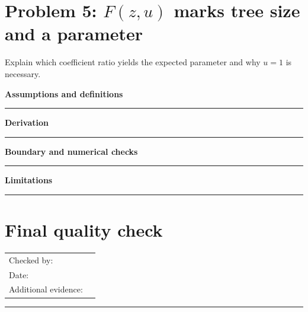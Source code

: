 \documentclass[11pt]{article}
\begin{document}
\section{\texorpdfstring{Problem 5: $F(z,u)$ marks tree size and a parameter}{Problem 5: Bivariate generating function F(z,u) marking tree size and a parameter}}
Explain which coefficient ratio yields the expected parameter and why $u=1$ is necessary.\par\medskip
\textbf{Assumptions and definitions}\par\vspace{0.7cm}\hrule\vspace{0.35cm}
\textbf{Derivation}\par\vspace{2.1cm}\hrule\vspace{0.3cm}
\textbf{Boundary and numerical checks}\par\vspace{1.1cm}\hrule\vspace{0.35cm}
\textbf{Limitations}\par\vspace{0.9cm}\hrule\vspace{0.35cm}
\clearpage
\section{Final quality check}
\begin{tabularx}{\linewidth}{@{}lX@{}}Checked by: & \hrulefill\\ Date: & \hrulefill\\ Additional evidence: & \hrulefill\\\end{tabularx}
\vspace{3cm}\hrule
\end{document}
